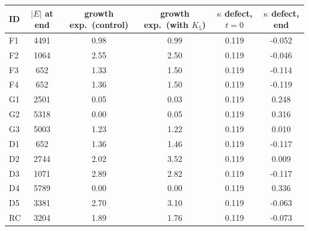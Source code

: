 \begin{tabular}{lccccc}
\toprule
ID & $|E|$ at end & growth exp.\ (control) & growth exp.\ (with $K_5$) & $\kappa$ defect, $t{=}0$ & $\kappa$ defect, end\\
\midrule
F1 & 4491 & 0.98 & 0.99 & 0.119 & -0.052\\
F2 & 1064 & 2.55 & 2.50 & 0.119 & -0.046\\
F3 & 652 & 1.33 & 1.50 & 0.119 & -0.114\\
F4 & 652 & 1.36 & 1.50 & 0.119 & -0.119\\
G1 & 2501 & 0.05 & 0.03 & 0.119 & 0.248\\
G2 & 5318 & 0.00 & 0.05 & 0.119 & 0.316\\
G3 & 5003 & 1.23 & 1.22 & 0.119 & 0.010\\
D1 & 652 & 1.36 & 1.46 & 0.119 & -0.117\\
D2 & 2744 & 2.02 & 3.52 & 0.119 & 0.009\\
D3 & 1071 & 2.89 & 2.82 & 0.119 & -0.117\\
D4 & 5789 & 0.00 & 0.00 & 0.119 & 0.336\\
D5 & 3381 & 2.70 & 3.10 & 0.119 & -0.063\\
RC & 3204 & 1.89 & 1.76 & 0.119 & -0.073\\
\bottomrule
\end{tabular}
